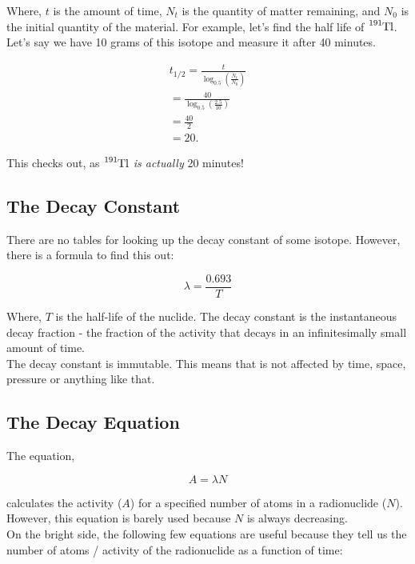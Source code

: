 \documentclass{article}
\begin{document}
\begin{multicols*}{2}
    Where, $t$ is the amount of time, $N_t$ is the quantity of matter remaining,
    and $N_0$ is the initial quantity of the material. For example, let's find
    the half life of $\ce{^{191}Tl}$. Let's say we have 10 grams of this isotope
    and measure it after 40 minutes.

    \begin{equation*}
      \begin{split}
        t_{1/2} = \frac{t}{ \log_{0.5}\left( \frac{N_t}{N_0} \right) } \\
        = \frac{40}{ \log_{0.5}\left( \frac{2.5}{10} \right) } \\
        = \frac{40}{2} \\
        = 20.
      \end{split}
    \end{equation*}
    
    This checks out, as $\ce{^{191}Tl}$ \textit{is actually} 20 minutes!
    \subsection{The Decay Constant}
    There are no tables for looking up the decay constant of some isotope.
    However, there is a formula to find this out:

    \[
      \lambda = \frac{0.693}{T}
    \]

    Where, $T$ is the half-life of the nuclide. The decay constant is the
    instantaneous decay fraction - the fraction of the activity that decays
    in an infinitesimally small amount of time.\\

    The decay constant is immutable. This means that is not affected by time,
    space, pressure or anything like that.
    
    \subsection{The Decay Equation}
    The equation,

    \[
      A = \lambda{N}
    \]

    calculates the activity ($A$) for a specified number of atoms in a
    radionuclide ($N$). However, this equation is barely used because
    $N$ is always decreasing.\\
    
    On the bright side, the following few equations are useful because
    they tell us the number of atoms / activity of the radionuclide as
    a function of time:


\end{multicols*}
\end{document}
